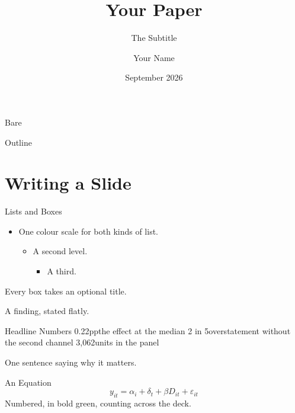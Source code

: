 \documentclass[aspectratio=169,10pt,t]{beamer}
\title{Your Paper}
\subtitle{The Subtitle}
\author{Your Name}
\institute{Your Institution}
\date{September 2026}
\begin{document}
\begin{frame}
  \titlepage
\end{frame}

\begin{frame}{Bare}
  \tableofcontents[hideallsubsections]
\end{frame}

\begin{frame}{Outline}
  \toccontent
\end{frame}

\section{Writing a Slide}

\begin{frame}{Lists and Boxes}
  \begin{itemize}
    \item One colour scale for both kinds of list.
    \begin{itemize}
      \item A second level.
      \begin{itemize}\item A third.\end{itemize}
    \end{itemize}
  \end{itemize}

  \begin{takeaway}
    Every box takes an optional title.
  \end{takeaway}

  \begin{result}
    A finding, stated flatly.
  \end{result}
\end{frame}

\begin{frame}{Headline Numbers}
  \statrow
    {0.22pp}{the effect at the median}
    {2 in 5}{overstatement without the second channel}
    {3{,}062}{units in the panel}

  \vspace{1.2em}
    {One sentence saying why it matters.}
\end{frame}

\begin{frame}{An Equation}
  \begin{equation}
    y_{it} = \alpha_i + \delta_t + \beta D_{it} + \varepsilon_{it}
  \end{equation}
  Numbered, in bold green, counting across the deck.
\end{frame}
\end{document}

